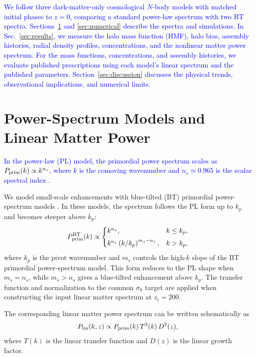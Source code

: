 \documentclass[
 reprint,
 superscriptaddress,
 nofootinbib,
 nobibnotes,
 amsmath,
 amssymb,
 aps,
 prd,
 floatfix,
 longbibliography
]{revtex4-2}
\DeclareRobustCommand{\change}[1]{\textcolor{blue}{#1}}
\begin{document}
\change{We follow three dark-matter-only cosmological \(N\)-body models with matched initial phases to \(z=0\), comparing a standard power-law spectrum with two BT spectra. Sections~\ref{sec:theory} and \ref{sec:numerical} describe the spectra and simulations. In Sec.~\ref{sec:results}, we measure the halo mass function (HMF), halo bias, assembly histories, radial density profiles, concentrations, and the nonlinear matter power spectrum. For the mass functions, concentrations, and assembly histories, we evaluate published prescriptions using each model's linear spectrum and the published parameters. Section~\ref{sec:discussion} discusses the physical trends, observational implications, and numerical limits.}

\section{Power-Spectrum Models and Linear Matter Power}
\label{sec:theory}
\label{subsec:power_models}

\change{In the power-law (PL) model, the primordial power spectrum scales as \(P_{\rm prim}(k)\propto k^{n_s}\), where \(k\) is the comoving wavenumber and \(n_s\simeq0.965\) is the scalar spectral index \citep{Planck20CMB}.}

We model small-scale enhancements with blue-tilted (BT) primordial power-spectrum models \citep[e.g.][]{Hira24bluetilt,Dekker25DwarfPPS}. In these models, the spectrum follows the PL form up to \(k_p\) and becomes steeper above \(k_p\):
\begin{equation}
P_{\rm prim}^{\rm BT}(k)
\propto
\begin{cases}
k^{n_s}, & k \le k_p,\\[4pt]
k^{n_s}\left(k/k_p\right)^{m_s-n_s}, & k > k_p,
\end{cases}
\label{eq:bt_input_power}
\end{equation}
where \(k_p\) is the pivot wavenumber and \(m_s\) controls the high-\(k\) slope of the BT primordial power-spectrum model. This form reduces to the PL shape when \(m_s=n_s\), while \(m_s>n_s\) gives a blue-tilted enhancement above \(k_p\). The transfer function and normalization to the common \(\sigma_8\) target are applied when constructing the input linear matter spectrum at \(z_i=200\).

The corresponding linear matter power spectrum can be written schematically as
\begin{equation}
P_{\rm lin}(k,z) \propto P_{\rm prim}(k)\,T^2(k)\,D^2(z),
\label{eq:P_MD}
\end{equation}
where \(T(k)\) is the linear transfer function and \(D(z)\) is the linear growth factor.
\end{document}

